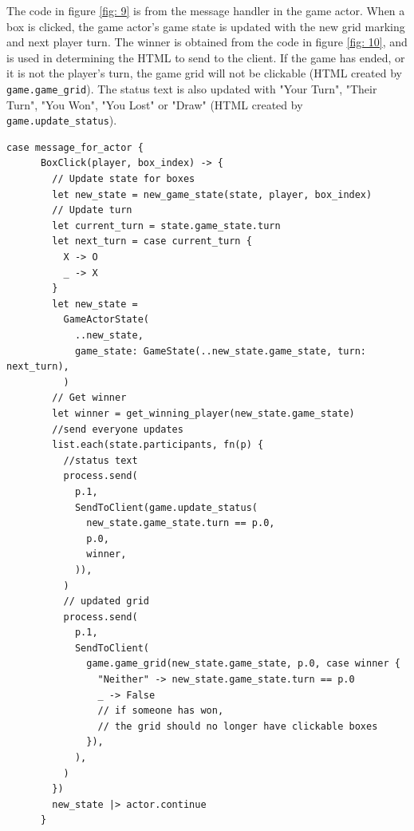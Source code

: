\documentclass[]{final}
\begin{document}
\begin{minipage}[t]{18em}

  The code in figure \ref{fig: 9} is from the message handler in the game actor.
  When a box is clicked, the game actor's game state is updated with the new
  grid marking and next player turn. The winner is obtained from the code in
  figure \ref{fig: 10}, and is used in determining the HTML to send to the client.
  If the game has ended, or it is not the player's turn, the game grid will not be
  clickable (HTML created by \texttt{game.game\_grid}). The status text is also
  updated with "Your Turn", "Their Turn", "You Won",
  "You Lost" or "Draw" (HTML created by \texttt{game.update\_status}).

\end{minipage}
\hfill
\begin{minipage}[t]{20em}
  \begin{lstlisting}[language=gleam]
    case message_for_actor {
      BoxClick(player, box_index) -> {
        // Update state for boxes
        let new_state = new_game_state(state, player, box_index)
        // Update turn
        let current_turn = state.game_state.turn
        let next_turn = case current_turn {
          X -> O
          _ -> X
        }
        let new_state =
          GameActorState(
            ..new_state,
            game_state: GameState(..new_state.game_state, turn: next_turn),
          )
        // Get winner
        let winner = get_winning_player(new_state.game_state)
        //send everyone updates
        list.each(state.participants, fn(p) {
          //status text
          process.send(
            p.1,
            SendToClient(game.update_status(
              new_state.game_state.turn == p.0,
              p.0,
              winner,
            )),
          )
          // updated grid
          process.send(
            p.1,
            SendToClient(
              game.game_grid(new_state.game_state, p.0, case winner {
                "Neither" -> new_state.game_state.turn == p.0
                _ -> False
                // if someone has won,
                // the grid should no longer have clickable boxes
              }),
            ),
          )
        })
        new_state |> actor.continue
      }
  \end{lstlisting}
  \label{fig: 9}
\end{minipage}

\newpage
\end{document}
